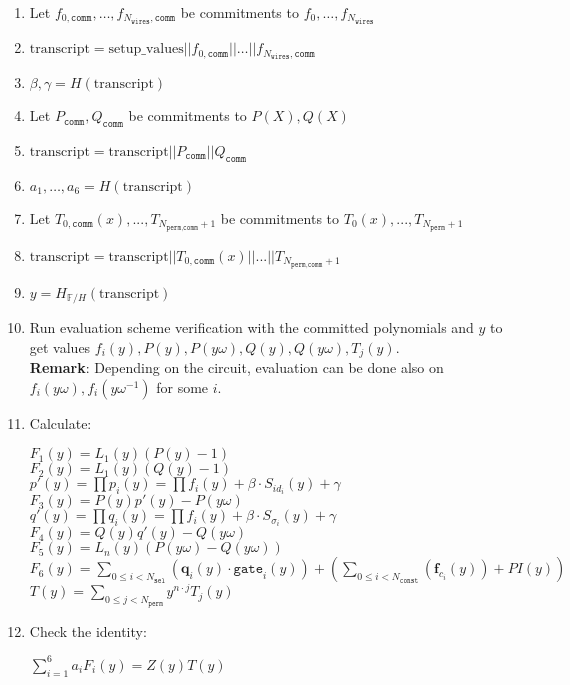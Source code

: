 \begin{enumerate}
	\item Let $f_{0, \texttt{comm}}, \dots, f_{N_{\texttt{wires}}, \texttt{comm}}$ be commitments to $f_{0}, \dots, f_{N_{\texttt{wires}}}$
	\item $\text{transcript} = \text{setup\_values} || f_{0, \texttt{comm}} || \dots || f_{N_{\texttt{wires}}, \texttt{comm}}$
	\item $\beta, \gamma = H(\text{transcript})$
	\item Let $P_{\texttt{comm}}, Q_{\texttt{comm}}$ be commitments to $P(X), Q(X)$
	\item $\text{transcript} = \text{transcript} || P_{\texttt{comm}} || Q_{\texttt{comm}}$
	\item $a_1, \dots, a_6 = H(\text{transcript})$
	\item Let $T_{0, \texttt{comm}}(x), ..., T_{N_{\texttt{perm}, \texttt{comm}} + 1}$ be commitments to $T_0(x), ..., T_{N_{\texttt{perm}} + 1}$ 
	\item $\text{transcript} = \text{transcript} || T_{0, \texttt{comm}}(x) || ... || T_{N_{\texttt{perm}, \texttt{comm}} + 1}$
	\item $y = H_{\mathbb{F}/H}(\text{transcript})$
	\item Run evaluation scheme verification with the committed polynomials and $y$ to get values 
		$f_i(y), P(y), P(y\omega), Q(y), Q(y\omega), T_j(y)$.  \\
		\textbf{Remark}: Depending on the circuit, evaluation can be done also on $f_i(y\omega), f_i(y\omega^{-1})$ for some $i$.
	\item Calculate:
	\begin{center}
		$F_1(y) = L_1(y)(P(y) - 1)$ \\
		$F_2(y) = L_1(y)(Q(y) - 1)$ \\
		$p'(y) = \prod p_i(y) = \prod f_i(y) + \beta \cdot S_{id_i}(y) + \gamma$ \\
		$F_3(y) = P(y)p'(y) - P(y\omega)$ \\
		$q'(y) = \prod q_i(y) = \prod f_i(y) + \beta \cdot S_{\sigma_i}(y) + \gamma$ \\
		$F_4(y) = Q(y)q'(y) - Q(y\omega)$ \\
		$F_5(y) = L_n(y)(P(y\omega) - Q(y\omega))$ \\
		$F_6(y) = \sum\limits_{0 \leq i < N_{\texttt{sel}}} (\textbf{q}_{i}(y) \cdot \texttt{gate}_i(y))
			+ (\sum\limits_{0 \leq i < N_{\texttt{const}}}(\textbf{f}_{c_i}(y)) + PI(y))$ \\
		$T(y) = \sum\limits_{0 \leq j < N_{\texttt{perm}}}y^{n \cdot j}T_j(y)$
	\end{center}
	\item Check the identity:
	\begin{center}
		$\sum\limits_{i = 1}^6a_iF_i(y) = Z(y)T(y)$
	\end{center}
\end{enumerate}